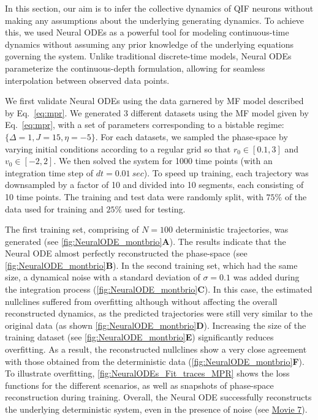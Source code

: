 \documentclass[preprint,11pt,authoryear]{elsarticle}
\begin{document}
In this section, our aim is to infer the collective dynamics of QIF neurons without making any assumptions about the underlying generating dynamics. To achieve this, we used Neural ODEs as a powerful tool for modeling continuous-time dynamics without assuming any prior knowledge of the underlying equations governing the system. Unlike traditional discrete-time models, Neural ODEs parameterize the continuous-depth formulation, allowing for seamless interpolation between observed data points.


We first validate Neural ODEs using the data garnered by MF model described by Eq.~\eqref{eq:mpr}.  We generated 3 different datasets using the MF model given by Eq.~\eqref{eq:mpr}, with a set of parameters corresponding to a bistable regime: $\{\Delta=1,J=15,\eta=-5\}$. For each datasets, we sampled the phase-space by varying initial conditions according to a regular grid so that $r_0\in[0.1, 3]$ and $v_0\in[-2,2]$. We then solved the system for 1000 time points (with an integration time step of $dt=0.01~sec$). To speed up training, each trajectory was downsampled by a factor of 10 and divided into 10 segments, each consisting of 10 time points. The training and test data were randomly split, with $75\%$ of the data used for training and $25\%$ used for testing. 


The first training set, comprising of $N=100$ deterministic trajectories, was generated (see \autoref{fig:NeuralODE_montbrio}\textbf{A}). The results indicate that the Neural ODE almost perfectly reconstructed the phase-space (see \autoref{fig:NeuralODE_montbrio}\textbf{B}). In the second training set, which had the same size, a dynamical noise with a standard deviation of $\sigma=0.1$ was added during the integration process (\autoref{fig:NeuralODE_montbrio}\textbf{C}). In this case, the estimated nullclines suffered from overfitting although without affecting the overall reconstructed dynamics, as the predicted trajectories were still very similar to the original data  (as shown \autoref{fig:NeuralODE_montbrio}\textbf{D}). Increasing the size of the training dataset (see \autoref{fig:NeuralODE_montbrio}\textbf{E}) significantly reduces overfitting.  As a result, the reconstructed nullclines show a very close agreement with those obtained from the deterministic data (\autoref{fig:NeuralODE_montbrio}\textbf{F}).
To illustrate overfitting, \autoref{fig:NeuralODEs_Fit_traces_MPR} shows the loss functions for the different scenarios, as well as snapshots of phase-space reconstruction during training. Overall, the Neural ODE successfully reconstructs the underlying deterministic system, even in the presence of noise (see \href{run:https://github.com/ins-amu/Inference_MFM/blob/main/Videos/Movie7_MPR_PhasePlane_NeuralODEs.mp4}{Movie 7}).
\end{document}
